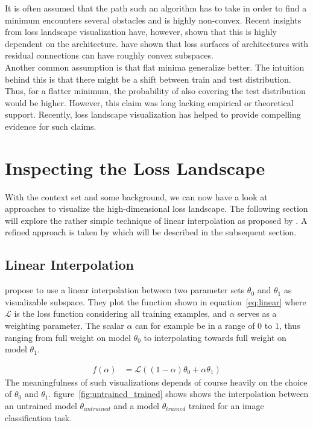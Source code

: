 \documentclass[a4paper]{scrartcl}
\begin{document}
It is often assumed that the path such an algorithm has to take in order to find a minimum encounters several obstacles and is highly non-convex. Recent insights from loss landscape visualization have, however, shown that this is highly dependent on the architecture. \citet{li2017visualizing} have shown that loss surfaces of architectures with residual connections can have roughly convex subspaces.\\
Another common assumption is that flat minima generalize better. The intuition behind this is that there might be a shift between train and test distribution. Thus, for a flatter minimum, the probability of also covering the test distribution would be higher. However, this claim was long lacking empirical or theoretical support. Recently, loss landscape visualization has helped to provide compelling evidence for such claims.


\section*{Inspecting the Loss Landscape}
With the context set and some background, we can now have a look at approaches to visualize the high-dimensional loss landscape. The following section will explore the rather simple technique of linear interpolation as proposed by \citet{goodfellow2014qualitatively}. A refined approach is taken by \citet{li2017visualizing} which will be described in the subsequent section.



\subsection*{Linear Interpolation}
\citet{goodfellow2014qualitatively} propose to use a linear interpolation between two parameter sets $\theta_0$ and $\theta_1$ as visualizable subspace. They plot the function shown in equation~\ref{eq:linear} where $\mathcal{L}$ is the loss function considering all training examples, and $\alpha$ serves as a weighting parameter. The scalar $\alpha$ can for example be in a range of $0$ to $1$, thus ranging from full weight on model $\theta_0$ to interpolating towards full weight on model $\theta_1$.

\begin{align}
\label{eq:linear}
	f(\alpha) &= \mathcal{L}((1-\alpha) \theta_0 + \alpha \theta_1)
\end{align}
The meaningfulness of such visualizations depends of course heavily on the choice of $\theta_0$ and $\theta_1$. figure~\ref{fig:untrained_trained} shows shows the interpolation between an untrained model $\theta_{untrained}$ and a model $\theta_{trained}$ trained for an image classification task.
\end{document}
